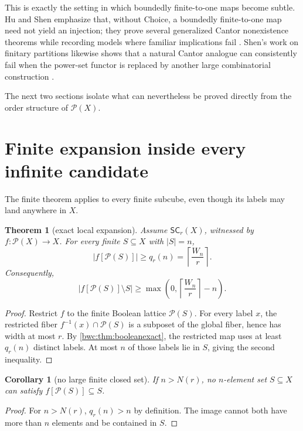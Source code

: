 \documentclass[11pt,letterpaper]{article}
\numberwithin{equation}{section}
\theoremstyle{plain}
\newtheorem{theorem}{Theorem}[section]
\newtheorem{corollary}[corollary]{Corollary}
\theoremstyle{definition}
\theoremstyle{remark}
\newcommand{\Pow}{\mathcal P}
\newcommand{\SC}{\mathsf{SC}}
\begin{document}
This is exactly the setting in which boundedly finite-to-one maps become
subtle.  Hu and Shen emphasize that, without Choice, a boundedly finite-to-one
map need not yield an injection; they prove several generalized Cantor
nonexistence theorems while recording models where familiar implications fail
\cite{HuShen2025}.  Shen's work on finitary partitions likewise shows that a
natural Cantor analogue can consistently fail when the power-set functor is
replaced by another large combinatorial construction \cite{Shen2026}.

The next two sections isolate what can nevertheless be proved directly from
the order structure of $\Pow(X)$.

\section{Finite expansion inside every infinite candidate}\label{bwc:sec:expansion}

The finite theorem applies to every finite subcube, even though its labels may
land anywhere in $X$.

\begin{theorem}[exact local expansion]\label{bwc:thm:localexpansion}
Assume $\SC_r(X)$, witnessed by $f:\Pow(X)\to X$.  For every finite
$S\subseteq X$ with $|S|=n$,
\[
       |f[\Pow(S)]|\geq q_r(n)
       =\left\lceil\frac{W_n}{r}\right\rceil.
\]
Consequently,
\[
 |f[\Pow(S)]\setminus S|\geq
       \max\left(0,\left\lceil\frac{W_n}{r}\right\rceil-n\right).
\]
\end{theorem}

\begin{proof}
Restrict $f$ to the finite Boolean lattice $\Pow(S)$.  For every label $x$,
the restricted fiber $f^{-1}(x)\cap\Pow(S)$ is a subposet of the global
fiber, hence has width at most $r$.  By \cref{bwc:thm:booleanexact}, the restricted
map uses at least $q_r(n)$ distinct labels.  At most $n$ of those labels lie
in $S$, giving the second inequality.
\end{proof}

\begin{corollary}[no large finite closed set]\label{bwc:cor:nofiniteclosed}
If $n>N(r)$, no $n$-element set $S\subseteq X$ can satisfy
$f[\Pow(S)]\subseteq S$.
\end{corollary}

\begin{proof}
For $n>N(r)$, $q_r(n)>n$ by definition.  The image cannot both have more than
$n$ elements and be contained in $S$.
\end{proof}
\end{document}
